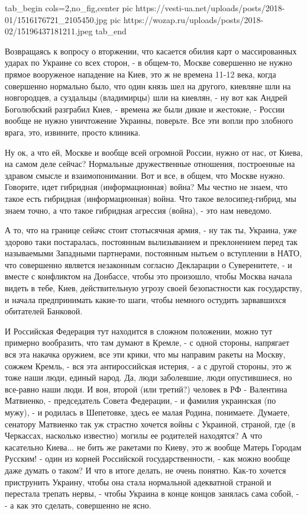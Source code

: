\ifcmt
  tab_begin cols=2,no_fig,center
     pic https://vesti-ua.net/uploads/posts/2018-01/1516176721_2105450.jpg
		 pic https://wozap.ru/uploads/posts/2018-02/15196437181211.jpeg 
  tab_end
\fi

Возвращаясь к вопросу о вторжении, что касается обилия карт о массированных
ударах по Украине со всех сторон, -  в общем-то, Москве совершенно не нужно
прямое вооруженое нападение на Киев, это ж не времена 11-12 века, когда
совершенно нормально было, что один князь шел на другого, киевляне шли на
новгородцев, а суздальцы (владимирцы) шли на киевлян, - ну вот как Андрей
Боголюбский разграбил Киев, - времена же были дикие и жестокие, - России вообще
не нужно уничтожение Украины, поверьте. Все эти вопли про злобного врага, это,
извините, просто клиника. 

Ну ок, а что ей, Москве и вообще всей огромной России, нужно от нас, от Киева,
на самом деле сейчас?  Нормальные дружественные отношения, построенные на
здравом смысле и взаимопонимании. Вот и все, в общем, что Москве нужно.
Говорите, идет гибридная (информационная) война? Мы честно не знаем, что такое
есть гибридная (информационная) война. Что такое велосипед-гибрид, мы знаем
точно, а что такое гибридная агрессия (война), - это нам неведомо. 

А то, что на границе сейачс стоит стотысячная армия, - ну так ты, Украина, уже
здорово таки постаралась, постоянным вылизыванием и преклонением перед так
называемыми Западными партнерами, постоянным нытьем о вступлении в НАТО, что
совершенно является незаконным согласно Декларации о Суверенитете, - и вместе с
конфликтом на Донбассе, чтобы это произошло, чтобы Москва начала видеть в тебе,
Киев, действительную угрозу своей безопастности как государству, и начала
предпринимать какие-то шаги, чтобы немного остудить зарвавшихся обитателей
Банковой.

И Российская Федерация тут находится в сложном положении, можно тут примерно
вообразить, что там думают в Кремле, - с одной стороны, напрягает вся эта
накачка оружием, все эти крики, что мы направим ракеты на Москву, сожжем
Кремль, - вся эта антироссийская истерия, - а с другой стороны, это ж тоже наши
люди, единый народ. Да, люди заболевшие, люди опустившиеся, но все-равно наши
люди.  И вон, второй (или третий?) человек в РФ - Валентина Матвиенко, -
председатель Совета Федерации, - и фамилия украинская (по мужу), - и родилась в
Шепетовке, здесь ее малая Родина, понимаете. Думаете, сенатору Матвиенко так уж
страстно хочется войны с Украиной, страной, где (в Черкассах, насколько
известно) могилы ее родителей находятся? А что касательно Киева... не бить же
ракетами по Киеву, это ж вообще Матерь Городам Русским! - один из корней
Российской государственности, - как можно вообще даже думать о таком? И что в
итоге делать, не очень понятно. Как-то хочется приструнить Украину, чтобы она
стала нормальной адекватной страной и перестала трепать нервы, - чтобы Украина
в конце концов занялась сама собой, - - а как это сделать, совершенно не ясно.

